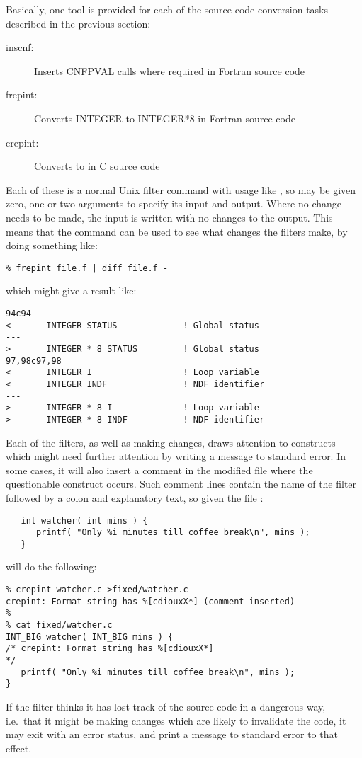 \documentclass[twoside,11pt]{article}
\renewcommand{\_}{\texttt{\symbol{95}}}
\begin{document}
Basically, one tool is provided for each of the source code conversion
tasks described in the previous section:
\begin{description}
\item[inscnf:] Inserts CNF\_PVAL calls where required in Fortran source code
\item[frepint:] Converts INTEGER to INTEGER*8 in Fortran source code
\item[crepint:] Converts  to \cc{INT\_BIG} in C source code
\end{description}
Each of these is a normal Unix filter command with usage like , 
so may be given zero, one or two arguments to specify its input and output.
Where no change needs to be made, the input is written with no changes 
to the output.  This means that the  command can be used 
to see what changes the filters make, by doing something like:
\begin{squote}
\begin{verbatim}
% frepint file.f | diff file.f -
\end{verbatim}
\end{squote}
which might give a result like:
\begin{squote}
\begin{verbatim}
94c94
<       INTEGER STATUS             ! Global status
---
>       INTEGER * 8 STATUS         ! Global status
97,98c97,98
<       INTEGER I                  ! Loop variable
<       INTEGER INDF               ! NDF identifier
---
>       INTEGER * 8 I              ! Loop variable
>       INTEGER * 8 INDF           ! NDF identifier
\end{verbatim}
\end{squote}

Each of the filters, as well as making changes, 
draws attention to constructs which might need 
further attention by writing a message to standard error. 
In some cases, it will also insert a comment in the modified file where
the questionable construct occurs.
Such comment lines contain the name of the filter followed by a colon
and explanatory text, so given the file :
\begin{squote}
\begin{verbatim}
   int watcher( int mins ) {
      printf( "Only %i minutes till coffee break\n", mins );
   }
\end{verbatim}
\end{squote}
 will do the following:
\begin{squote}
\begin{verbatim}
% crepint watcher.c >fixed/watcher.c
crepint: Format string has %[cdiouxX*] (comment inserted)
%
% cat fixed/watcher.c
INT_BIG watcher( INT_BIG mins ) {
/* crepint: Format string has %[cdiouxX*]                                */
   printf( "Only %i minutes till coffee break\n", mins );
}
\end{verbatim}
\end{squote}
If the filter thinks it has lost track of the source code in a dangerous
way, i.e.\ that it might be making changes which are likely to invalidate
the code, it may exit with an error status, and print a message to standard
error to that effect.
\end{document}
